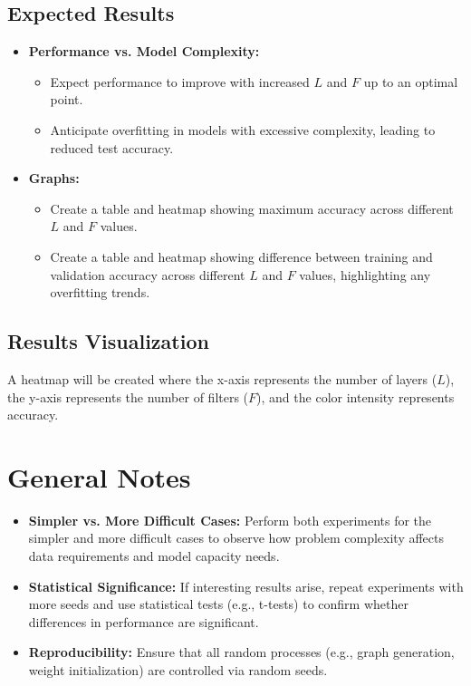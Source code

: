 \subsection{Expected Results}

\begin{itemize}
    \item \textbf{Performance vs. Model Complexity:}
    \begin{itemize}
        \item Expect performance to improve with increased $L$ and $F$ up to an optimal point.
        \item Anticipate overfitting in models with excessive complexity, leading to reduced test accuracy.
    \end{itemize}
    \item \textbf{Graphs:}
    \begin{itemize}
        \item Create a table and heatmap showing maximum accuracy across different $L$ and $F$ values.
        \item Create a table and heatmap showing difference between training and validation accuracy across different $L$ and $F$ values, highlighting any overfitting trends.
    \end{itemize}
\end{itemize}

\subsection{Results Visualization}

A heatmap will be created where the x-axis represents the number of layers ($L$), the y-axis represents the number of filters ($F$), and the color intensity represents accuracy.


\section{General Notes}

\begin{itemize}
    \item \textbf{Simpler vs. More Difficult Cases:} Perform both experiments for the simpler and more difficult cases to observe how problem complexity affects data requirements and model capacity needs.
    \item \textbf{Statistical Significance:} If interesting results arise, repeat experiments with more seeds and use statistical tests (e.g., t-tests) to confirm whether differences in performance are significant.
    \item \textbf{Reproducibility:} Ensure that all random processes (e.g., graph generation, weight initialization) are controlled via random seeds.
\end{itemize}


